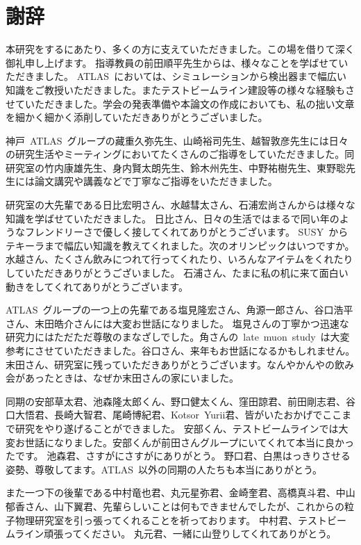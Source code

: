 \chapter*{謝辞}
\thispagestyle{empty}
本研究をするにあたり、多くの方に支えていただきました。この場を借りて深く御礼申し上げます。
指導教員の前田順平先生からは、様々なことを学ばせていただきました。
ATLAS~においては、シミュレーションから検出器まで幅広い知識をご教授いただきました。またテストビームライン建設等の様々な経験もさせていただきました。学会の発表準備や本論文の作成においても、私の拙い文章を細かく細かく添削していただきありがとうございました。

神戸~ATLAS~グループの藏重久弥先生、山崎裕司先生、越智敦彦先生には日々の研究生活やミーティングにおいてたくさんのご指導をしていただきました。同研究室の竹内康雄先生、身内賢太朗先生、鈴木州先生、中野祐樹先生、東野聡先生には論文講究や講義などで丁寧なご指導をいただきました。

研究室の大先輩である日比宏明さん、水越彗太さん、石浦宏尚さんからは様々な知識を学ばせていただきました。
日比さん、日々の生活ではまるで同い年のようなフレンドリーさで優しく接してくれてありがとうございます。
SUSY~からテキーラまで幅広い知識を教えてくれました。次のオリンピックはいつですか。
水越さん、たくさん飲みにつれて行ってくれたり、いろんなアイテムをくれたりしていただきありがとうございました。
石浦さん、たまに私の机に来て面白い動きをしてくれてありがとうございます。

ATLAS~グループの一つ上の先輩である塩見隆宏さん、角源一郎さん、谷口浩平さん、末田皓介さんには大変お世話になりました。
塩見さんの丁寧かつ迅速な研究力にはただただ尊敬のまなざしでした。角さんの~late~muon~study~は大変参考にさせていただきました。谷口さん、来年もお世話になるかもしれません。末田さん、研究室に残っていただきありがとうございます。なんやかんやの飲み会があったときは、なぜか末田さんの家にいました。

同期の安部草太君、池森隆太郎くん、野口健太くん、窪田諒君、前田剛志君、谷口大悟君、長崎大智君、尾崎博紀君、Kotsor~Yurii君、皆がいたおかげでここまで研究をやり遂げることができました。
安部くん、テストビームラインでは大変お世話になりました。安部くんが前田さんグループにいてくれて本当に良かったです。
池森君、さすがにさすがにありがとう。
野口君、白黒はっきりさせる姿勢、尊敬してます。ATLAS~以外の同期の人たちも本当にありがとう。

また一つ下の後輩である中村竜也君、丸元星弥君、金崎奎君、高橋真斗君、中山郁香さん、山下翼君、先輩らしいことは何もできませんでしたが、これからの粒子物理研究室を引っ張ってくれることを祈っております。
中村君、テストビームライン頑張ってください。
丸元君、一緒に山登りしてくれてありがとう。

